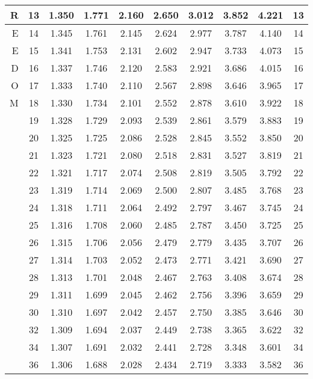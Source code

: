\begin{table}[h]
\begin{center}
\begin{tabular}{|r|c|c|c|c|c|c|c|c|c|}
\hline R  &13 &   1.350 &  1.771 &  2.160 &  2.650 &  3.012 &  3.852 &  4.221 &  13  \\ 
\hline E  &14 &   1.345 &  1.761 &  2.145 &  2.624 &  2.977 &  3.787 &  4.140 &  14  \\ 
\hline E  &15 &   1.341 &  1.753 &  2.131 &  2.602 &  2.947 &  3.733 &  4.073 &  15 \\ 
\hline D  &16 &   1.337 &  1.746 &  2.120 &  2.583 &  2.921 &  3.686 &  4.015 &  16 \\ 
\hline O  &17 &   1.333 &  1.740 &  2.110 &  2.567 &  2.898 &  3.646 &  3.965 &  17  \\ 
\hline M  &18 &   1.330 &  1.734 &  2.101 &  2.552 &  2.878 &  3.610 &  3.922 &  18  \\ 
\hline    &19 &   1.328 &  1.729 &  2.093 &  2.539 &  2.861 &  3.579 &  3.883 &  19  \\ 
\hline    &20 &   1.325 &  1.725 &  2.086 &  2.528 &  2.845 &  3.552 &  3.850 &  20  \\ 
\hline    &21 &   1.323 &  1.721 &  2.080 &  2.518 &  2.831 &  3.527 &  3.819 &  21  \\ 
\hline    &22 &   1.321 &  1.717 &  2.074 &  2.508 &  2.819 &  3.505 &  3.792 &  22  \\
\hline    &23 &   1.319 &  1.714 &  2.069 &  2.500 &  2.807 &  3.485 &  3.768 &  23  \\
\hline    &24 &   1.318 &  1.711 &  2.064 &  2.492 &  2.797 &  3.467 &  3.745 &  24  \\
\hline    &25 &   1.316 &  1.708 &  2.060 &  2.485 &  2.787 &  3.450 &  3.725 &  25  \\
\hline    &26 &   1.315 &  1.706 &  2.056 &  2.479 &  2.779 &  3.435 &  3.707 &  26  \\
\hline    &27 &   1.314 &  1.703 &  2.052 &  2.473 &  2.771 &  3.421 &  3.690 &  27  \\
\hline    &28 &   1.313 &  1.701 &  2.048 &  2.467 &  2.763 &  3.408 &  3.674 &  28  \\
\hline    &29 &   1.311 &  1.699 &  2.045 &  2.462 &  2.756 &  3.396 &  3.659 &  29  \\
\hline    &30 &   1.310 &  1.697 &  2.042 &  2.457 &  2.750 &  3.385 &  3.646 &  30  \\
\hline    &32 &   1.309 &  1.694 &  2.037 &  2.449 &  2.738 &  3.365 &  3.622 &  32  \\
\hline    &34 &   1.307 &  1.691 &  2.032 &  2.441 &  2.728 &  3.348 &  3.601 &  34 \\
\hline    &36 &   1.306 &  1.688 &  2.028 &  2.434 &  2.719 &  3.333 &  3.582 &  36  \\

\end{tabular}
\end{center}
\end{table}
